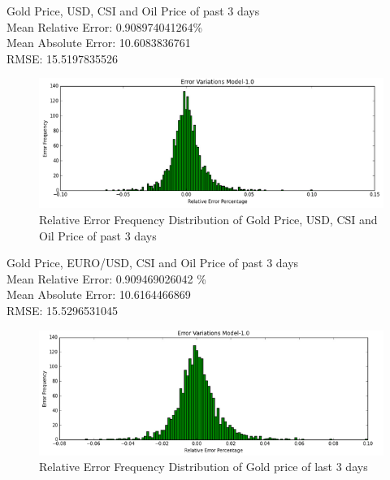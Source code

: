 \documentclass[runningheads]{llncs}
\begin{document}
\noindent Gold Price, USD, CSI and Oil Price of past 3 days \\
Mean Relative Error: 0.908974041264\% \\
Mean Absolute Error:  10.6083836761 \\
RMSE: 15.5197835526 \\
\begin{figure}
\centering
\includegraphics[width=\textwidth]{GoldUSDCSIOil_Daily.png}
\caption{Relative Error Frequency Distribution of Gold Price, USD, CSI and Oil Price of past 3 days}
\label{fig:GoldUSDCSIOil_Daily.png}
\end{figure}

\noindent Gold Price, EURO/USD, CSI and Oil Price of past 3 days \\
Mean Relative Error: 0.909469026042 \% \\
Mean Absolute Error: 10.6164466869 \\
RMSE: 15.5296531045 \\
\begin{figure}
\centering
\includegraphics[width=\textwidth]{GoldEuroCSIOil_Daily.png}
\caption{Relative Error Frequency Distribution of Gold price of last 3 days}
\label{fig:GoldEuroCSIOil_Daily.png}
\end{figure}
\end{document}
